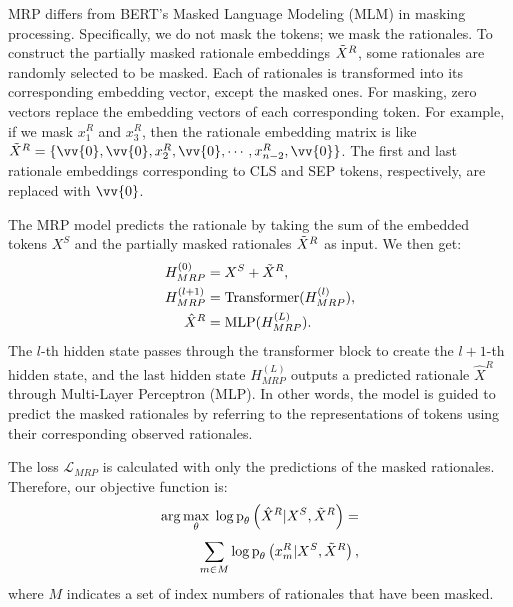 \documentclass[11pt]{article}
\newcommand{\prt}[1]{\text{p}_\theta\left( #1\right)}
\begin{document}
MRP differs from BERT's Masked Language Modeling (MLM) in masking processing. Specifically, we do not mask the tokens; we mask the rationales. To construct the partially masked rationale embeddings $\Tilde{X}^R$, some rationales are randomly selected to be masked. Each of rationales is transformed into its corresponding embedding vector, except the masked ones. For masking, zero vectors replace the embedding vectors of each corresponding token. For example, if we mask $x_1^R$ and $x_3^R$, then the rationale embedding matrix is like $\Tilde{X}^R=\{\vv{0}, \vv{0}, x_2^R, \vv{0}, \cdots, x_{n-2}^R, \vv{0}\}$. The first and last rationale embeddings corresponding to CLS and SEP tokens, respectively, are replaced with $\vv{0}$.

The MRP model predicts the rationale by taking the sum of the embedded tokens $X^S$ and the partially masked rationales $\Tilde{X}^R$ as input. We then get:
\begin{equation}
\begin{split}
    \displaystyle
    H_{MRP}^{(0)} &= X^S + \Tilde{X}^R, \\
    H_{MRP}^{(l+1)} &= \text{Transformer}(H_{MRP}^{(l)}), \\  \hat{X}^R &= \text{MLP}(H_{MRP}^{(L)}).
\end{split}
\label{eq_mrp_forward}
\end{equation}
The $l$-th hidden state passes through the transformer block to create the $l+1$-th hidden state, and the last hidden state $H_{MRP}^{(L)}$ outputs a predicted rationale $\hat{X}^R$ through Multi-Layer Perceptron (MLP). In other words, the model is guided to predict the masked rationales by referring to the representations of tokens using their corresponding observed rationales.

The loss $\mathcal{L}_{MRP}$ is calculated with only the predictions of the masked rationales. Therefore, our objective function is:
\begin{equation}
\begin{split}
    \displaystyle
    \arg \max_{\theta} \hspace{1mm} \log \prt{\hat{X}^R \vert X^S, \Tilde{X}^R} = \\ 
    \sum_{m \in M}^{}\log \prt{x_m^R \vert X^S, \Tilde{X}^R}, \\
\end{split}
\label{eq_mrp_obj}
\end{equation}
where $M$ indicates a set of index numbers of rationales that have been masked.
\end{document}

